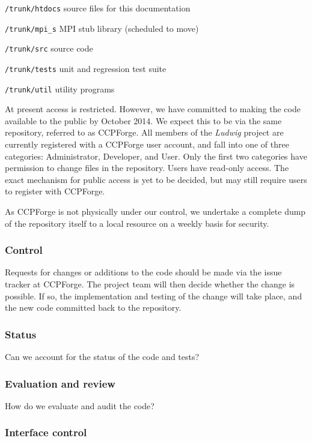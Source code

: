 \texttt{/trunk/htdocs} source files for this documentation

\texttt{/trunk/mpi\_s} MPI stub library (scheduled to move)

\texttt{/trunk/src} source code

\texttt{/trunk/tests} unit and regression test suite

\texttt{/trunk/util} utility programs

At present access is restricted. However, we have committed to making
the code available to the public by October 2014. We expect this to
be via the same repository, referred to as CCPForge.
All members of the \textit{Ludwig} project are currently registered with
a CCPForge user account, and fall into one of three categories:
Administrator, Developer, and User. Only the first two categories have
permission to change files in the repository. Users have read-only
access. The exact mechanism for public access is yet to be decided,
but may still require users to register with CCPForge.

As CCPForge is not physically under our control, we undertake a
complete dump of the repository itself to a local resource on a
weekly basis for security.

\subsubsection{Control}

Requests for changes or additions to the code should be made via
the issue tracker at CCPForge. The project team will then decide
whether the change is possible. If so, the implementation and
testing of the change will take place, and the new code committed
back to the repository.


\subsubsection{Status}

Can we account for the status of the code and tests?

\subsubsection{Evaluation and review}

How do we evaluate and audit the code?

\subsubsection{Interface control}

